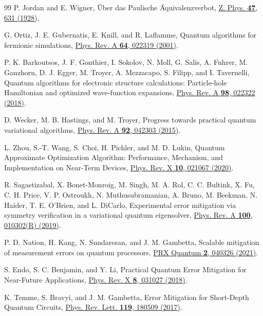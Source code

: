 \documentclass[aps,pra,reprint,superscriptaddress,floatfix,nofootinbib]{revtex4-2}
\begin{document}
\begin{thebibliography}{99}
P. Jordan and E. Wigner, {\"U}ber das Paulische {\"A}quivalenzverbot, \href{https://doi.org/10.1007/BF01331938}{Z. Phys. \textbf{47}, 631 (1928)}.

G. Ortiz, J. E. Gubernatis, E. Knill, and R. Laflamme, Quantum algorithms for fermionic simulations, \href{https://doi.org/10.1103/PhysRevA.64.022319}{Phys. Rev. A \textbf{64}, 022319 (2001)}.

P. K. Barkoutsos, J. F. Gonthier, I. Sokolov, N. Moll, G. Salis, A. Fuhrer, M. Ganzhorn, D. J. Egger, M. Troyer, A. Mezzacapo, S. Filipp, and I. Tavernelli, Quantum algorithms for electronic structure calculations: Particle-hole Hamiltonian and optimized wave-function expansions, \href{https://doi.org/10.1103/PhysRevA.98.022322}{Phys. Rev. A \textbf{98}, 022322 (2018)}.

D. Wecker, M. B. Hastings, and M. Troyer, Progress towards practical quantum variational algorithms, \href{https://doi.org/10.1103/PhysRevA.92.042303}{Phys. Rev. A \textbf{92}, 042303 (2015)}.

L. Zhou, S.-T. Wang, S. Choi, H. Pichler, and M. D. Lukin, Quantum Approximate Optimization Algorithm: Performance, Mechanism, and Implementation on Near-Term Devices, \href{https://doi.org/10.1103/PhysRevX.10.021067}{Phys. Rev. X \textbf{10}, 021067 (2020)}.

R. Sagastizabal, X. Bonet-Monroig, M. Singh, M. A. Rol, C. C. Bultink, X. Fu, C. H. Price, V. P. Ostroukh, N. Muthusubramanian, A. Bruno, M. Beekman, N. Haider, T. E. O'Brien, and L. DiCarlo, Experimental error mitigation via symmetry verification in a variational quantum eigensolver, \href{https://doi.org/10.1103/PhysRevA.100.010302}{Phys. Rev. A \textbf{100}, 010302(R) (2019)}.

P. D. Nation, H. Kang, N. Sundaresan, and J. M. Gambetta, Scalable mitigation of measurement errors on quantum processors, \href{https://doi.org/10.1103/PRXQuantum.2.040326}{PRX Quantum \textbf{2}, 040326 (2021)}.

S. Endo, S. C. Benjamin, and Y. Li, Practical Quantum Error Mitigation for Near-Future Applications, \href{https://doi.org/10.1103/PhysRevX.8.031027}{Phys. Rev. X \textbf{8}, 031027 (2018)}.

K. Temme, S. Bravyi, and J. M. Gambetta, Error Mitigation for Short-Depth Quantum Circuits, \href{https://doi.org/10.1103/PhysRevLett.119.180509}{Phys. Rev. Lett. \textbf{119}, 180509 (2017)}.


\end{thebibliography}
\end{document}
